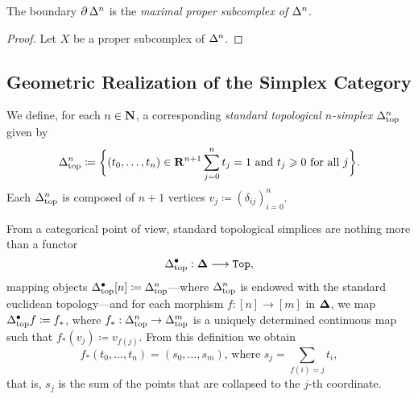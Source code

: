 \begin{proposition}
    \label{prop:boundary-maximal-proper-subcomplex}
    The boundary \(\operatorname{\partial} \Delta^n\) is the \emph{maximal proper subcomplex of
        \(\Delta^n\)}.
\end{proposition}

\begin{proof}
    Let \(X\) be a proper subcomplex of \(\Delta^n\).
\end{proof}

\subsection{Geometric Realization of the Simplex Category}

We define, for each \(n \in \mathbf{N}\), a corresponding \emph{standard topological
    \(n\)-simplex} \(\Delta_{\text{top}}^n\) given by
\[
    \Delta_{\text{top}}^n \coloneq \bigg\{(t_0, \dots, t_n) \in \mathbf{R}^{n+1} \relax \sum_{j=0}^n
    t_j = 1 \text{ and } t_j \geqslant 0 \text{ for all } j \bigg\}.
\]
Each \(\Delta_{\text{top}}^n\) is composed of \(n+1\) vertices
\(v_j \coloneq (\delta_{ij})_{i=0}^n\).

From a categorical point of view, standard topological simplices are nothing
more than a functor
\[
    \Delta_{\text{top}}^{\bullet}: {\mathbf{\Delta}} \longrightarrow {\texttt{Top}},
\]
mapping objects \(\Delta_{\text{top}}^{\bullet}[n] \coloneq \Delta_{\text{top}}^n\)---where
\(\Delta_{\text{top}}^n\) is endowed with the standard euclidean topology---and for each
morphism \(f: [n] \to [m]\) in \({\mathbf{\Delta}}\), we map
\(\Delta_{\text{top}}^{\bullet} f \coloneq f_{*}\), where
\(f_{*}: \Delta_{\text{top}}^n \to \Delta_{\text{top}}^m\) is a uniquely determined continuous map
such that \(f_{*}(v_j) \coloneq v_{f(j)}\). From this definition we obtain
\[
    f_{*}(t_0, \dots, t_n) = (s_0, \dots, s_m) \text{,\ \ where \ }
    s_j = \sum_{f(i) = j} t_i,
\]
that is, \(s_j\) is the sum of the points that are collapsed to the \(j\)-th
coordinate.

